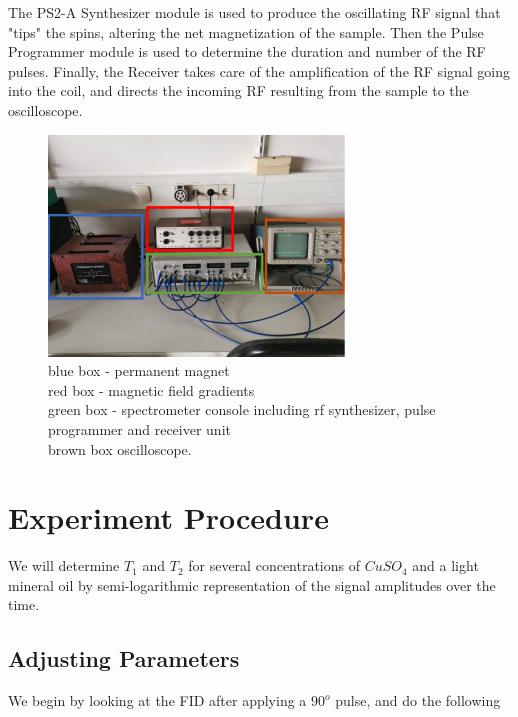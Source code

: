 \documentclass[12pt]{article}
\begin{document}
The PS2-A Synthesizer module is used to produce the oscillating RF signal that "tips" the spins, altering the net magnetization of the sample. Then the Pulse Programmer module is used to determine the duration and number of the RF pulses. Finally, the Receiver takes care of the amplification of the RF signal going into the coil, and directs the incoming RF resulting from the sample to the oscilloscope.
\begin{figure}[h!]
  \centering
  \includegraphics[width=0.7\textwidth]{exp_setup.png}
  \caption{
  blue box - permanent magnet \\
  red box - magnetic field gradients \\
  green box - spectrometer console including rf synthesizer, pulse programmer and receiver unit \\
  brown box oscilloscope. \cite{experimental_setup_manual}}
  \label{fig:example}
\end{figure}

\section{Experiment Procedure}

We will determine $T_1$ and $T_2$ for several concentrations of $CuSO_4$ and a light mineral oil by semi-logarithmic representation of the signal amplitudes over the time.

\subsection{Adjusting Parameters}

We begin by looking at the FID after applying a $90^o$ pulse, and do the following
\end{document}
